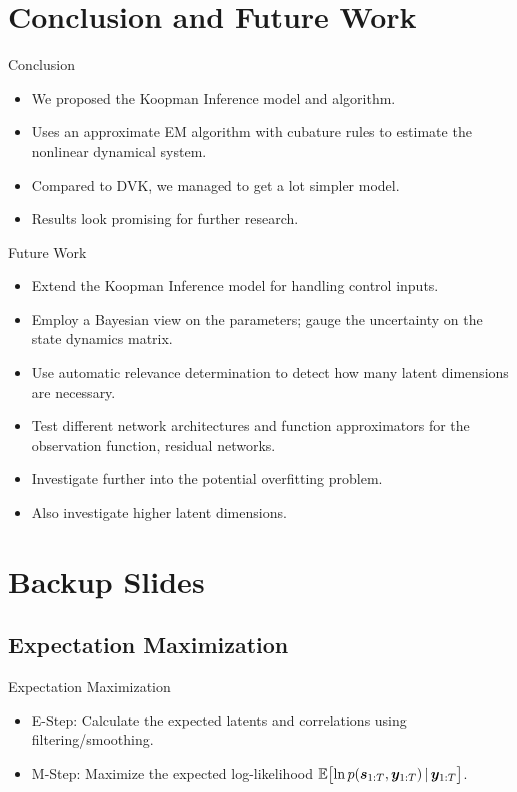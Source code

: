 \documentclass[
	aspectratio=43,
	color={accentcolor=1c},
	logo=false,
	colorframetitle=true,
]{tudabeamer}
\begin{document}
	\section{Conclusion and Future Work}
		\begin{frame}{Conclusion}
			\begin{itemize}
				\item We proposed the Koopman Inference model and algorithm.
				\item Uses an approximate EM algorithm with cubature rules to estimate the nonlinear dynamical system.
				\item Compared to DVK, we managed to get a lot simpler model.
				\item Results look promising for further research.
			\end{itemize}
		\end{frame}

		\begin{frame}{Future Work}
			\begin{itemize}
				\item Extend the Koopman Inference model for handling control inputs.
				\item Employ a Bayesian view on the parameters; gauge the uncertainty on \eg the state dynamics matrix.
				\item Use automatic relevance determination to detect how many latent dimensions are necessary.
				\item Test different network architectures and function approximators for the observation function, \eg residual networks.
				\item Investigate further into the potential overfitting problem.
				\item Also investigate higher latent dimensions.
			\end{itemize}
		\end{frame}





	\appendix

	\section{Backup Slides} \sectionslide
		\subsection{Expectation Maximization}
			\begin{frame}{Expectation Maximization}
				\begin{itemize}
					\item E-Step: Calculate the expected latents and correlations using filtering/smoothing.
					\item M-Step: Maximize the expected log-likelihood \( \mathbb{E}\big[\! \ln p(\bm{s}_{1:T}, \bm{y}_{1:T}) \,\vert\, \bm{y}_{1:T} \big] \).
				\end{itemize}
			\end{frame}
\end{document}
